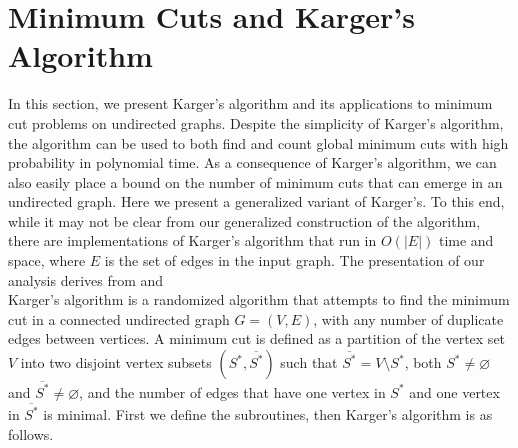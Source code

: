\documentclass[psamsfonts, 10pt]{amsart}
\theoremstyle{definition}
\theoremstyle{remark}
\numberwithin{equation}{section}
\begin{document}
\section{Minimum Cuts and Karger's Algorithm}
In this section, we present Karger's algorithm \cite{kargersalg} and its applications to minimum cut problems on undirected graphs. Despite the simplicity of Karger's algorithm, the algorithm can be used to both find and count global minimum cuts with high probability in polynomial time. As a consequence of Karger's algorithm, we can also easily place a bound on the number of minimum cuts that can emerge in an undirected graph. Here we present a generalized variant of Karger's. To this end, while it may not be clear from our generalized construction of the algorithm, there are implementations of Karger's algorithm that run in $O(\lvert E \rvert)$ time and space, where $E$ is the set of edges in the input graph. The presentation of our analysis derives from \cite{kargersalg} and \cite{princetonpaper} \\

Karger's algorithm is a randomized algorithm that attempts to find the minimum cut in a connected undirected graph $G= (V,E)$, with any number of duplicate edges between vertices. A minimum cut is defined as a partition of the vertex set $V$ into two disjoint vertex subsets $(S^*, \overline{S^*})$ such that $\overline{S^*} = V \setminus S^*$, both $S^* \neq \varnothing$ and $\overline{S^*} \neq \varnothing$, and the number of edges that have one vertex in $S^*$ and one vertex in $\overline{S^*}$ is minimal. First we define the subroutines, then Karger's algorithm is as follows. \\
\end{document}
